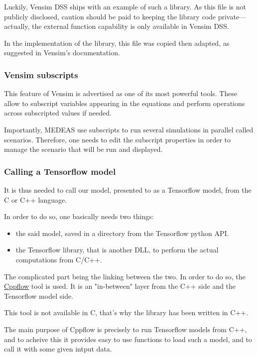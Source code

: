 Luckily, %
Vensim DSS ships with an example of such a library. As this file is not publicly disclosed, caution should be paid to keeping the library code private---actually, the external function capability is only available in Vensim DSS.

In the implementation of the library, this file was copied then adapted, as suggested in Vensim's documentation.

\subsubsection{Vensim subscripts}

This feature of Vensim is advertised as one of its most powerful tools. These allow to subscript variables appearing in the equations and perform operations across subscripted values if needed.  

Importantly, MEDEAS use subscripts to run several simulations in parallel called scenarios. Therefore, one needs to edit the subscript properties in order to manage the scenario that will be run and displayed.

\subsubsection{Calling a Tensorflow model}

It is thus needed to call our model, presented to as a Tensorflow model, from the C or C++ language.

In order to do so, one basically needs two things:
\begin{itemize}
    \item the said model, saved in a directory from the Tensorflow python API.
    \item the Tensorflow library, that is another DLL, to perform the actual computations from C/C++.
\end{itemize}

The complicated part being the linking between the two. In order to do so, the \href{https://serizba.github.io/cppflow/}{Cppflow} tool is used. It is an "in-between" layer from the C++ side and the Tensorflow model side.

This tool is not available in C, that's why the library has been written in C++.

The main purpose of Cppflow is precisely to run Tensorflow models from C++, and to acheive this it provides easy to use functions to load such a model, and to call it with some given intput data.


